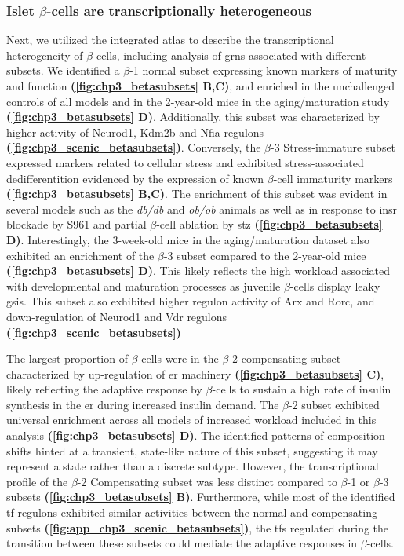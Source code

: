 \subsubsection{Islet $\beta$-cells are transcriptionally heterogeneous}
\par Next, we utilized the integrated atlas to describe the transcriptional heterogeneity of $\beta$-cells, including analysis of \glspl{grn} associated with different subsets. We identified a $\beta$-1 normal subset expressing known markers of maturity and function \textbf{(\autoref{fig:chp3_betasubsets} B,C)}, and enriched in the unchallenged controls of all models and in the 2-year-old mice in the aging/maturation study \textbf{(\autoref{fig:chp3_betasubsets} D)}. Additionally, this subset was characterized by higher activity of Neurod1, Kdm2b and Nfia regulons \textbf{(\autoref{fig:chp3_scenic_betasubsets})}. Conversely, the $\beta$-3 Stress-immature subset expressed markers related to cellular stress and exhibited stress-associated dedifferentition evidenced by the expression of known $\beta$-cell immaturity markers \textbf{(\autoref{fig:chp3_betasubsets} B,C)}. The enrichment of this subset was evident in several models such as the \textit{db/db} and \textit{ob/ob} animals as well as in response to \gls{insr} blockade by S961 and partial $\beta$-cell ablation by \gls{stz} \textbf{(\autoref{fig:chp3_betasubsets} D)}. Interestingly, the 3-week-old mice in the aging/maturation dataset also exhibited an enrichment of the $\beta$-3 subset compared to the 2-year-old mice \textbf{(\autoref{fig:chp3_betasubsets} D)}. This likely reflects the high workload associated with developmental and maturation processes as juvenile $\beta$-cells display leaky \gls{gsis}. This subset also exhibited higher regulon activity of Arx and Rorc, and down-regulation of Neurod1 and Vdr regulons \textbf{(\autoref{fig:chp3_scenic_betasubsets})}\\%

\par The largest proportion of $\beta$-cells were in the $\beta$-2 compensating subset characterized by up-regulation of \gls{er} machinery \textbf{(\autoref{fig:chp3_betasubsets} C)}, likely reflecting the adaptive response by $\beta$-cells to sustain a high rate of insulin synthesis in the \gls{er} during increased insulin demand. The $\beta$-2 subset exhibited universal enrichment across all models of increased workload included in this analysis \textbf{(\autoref{fig:chp3_betasubsets} D)}. The identified patterns of composition shifts hinted at a transient, state-like nature of this subset, suggesting it may represent a state rather than a discrete subtype. However, the transcriptional profile of the $\beta$-2 Compensating subset was less distinct compared to $\beta$-1 or $\beta$-3 subsets \textbf{(\autoref{fig:chp3_betasubsets} B)}. Furthermore, while most of the identified \gls{tf}-regulons exhibited similar activities between the normal and compensating subsets \textbf{(\autoref{fig:app_chp3_scenic_betasubsets})}, the \glspl{tf} regulated during the transition between these subsets could mediate the adaptive responses in $\beta$-cells.\\

